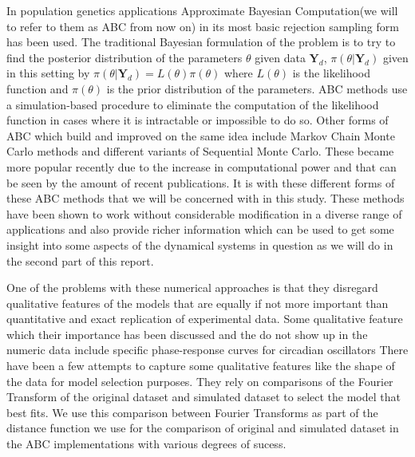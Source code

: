 \documentclass[12pt,a4paper,titlepage]{article}
\begin{document}
In population genetics applications Approximate Bayesian Computation(we will to refer to them as ABC from now on) in its most basic rejection sampling form has been used\cite{pritchard1999population}. The traditional Bayesian formulation of the problem is to try to find the posterior distribution of the parameters $\theta$ given data $\mathbf{Y}_{d}$, $\pi(\theta | \mathbf{Y}_{d})$ given in this setting by $\pi(\theta | \mathbf{Y}_{d}) = L(\theta)\pi(\theta)$ where $L(\theta)$ is the likelihood function and $\pi(\theta)$ is the prior distribution of the parameters. ABC methods use a simulation-based procedure to eliminate the computation of the likelihood function in cases where it is intractable or impossible to do so. Other forms of ABC which build and improved on the same idea include Markov Chain Monte Carlo methods\cite{marjoram2003markov} and different variants of Sequential Monte Carlo\cite{del2006sequential, sisson2007sequential, toni2009abc}. These became more popular recently due to the increase in computational power and that can be seen by the amount of recent publications. It is with these different forms of these ABC methods that we will be concerned with in this study. These methods have been shown to work without considerable modification in a diverse range of applications\cite{toni2009abc} and also provide richer information which can be used to get some insight into some aspects of the dynamical systems in question as we will do in the second part of this report.

One of the problems with these numerical approaches is that they disregard qualitative features of the models that are equally if not more important than quantitative and exact replication of experimental data. Some qualitative feature which their importance has been discussed and the do not show up in the numeric data include specific phase-response curves for circadian oscillators\cite{pfeuty2011robust}%
There have been a few attempts to capture some qualitative features like the shape of the data for model selection purposes. They rely on comparisons of the Fourier Transform of the original dataset and simulated dataset to select the model that best fits\cite{konopka2010gene}. We use this comparison between Fourier Transforms as part of the distance function we use for the comparison of original and simulated dataset in the ABC implementations with various degrees of sucess.
\end{document}
